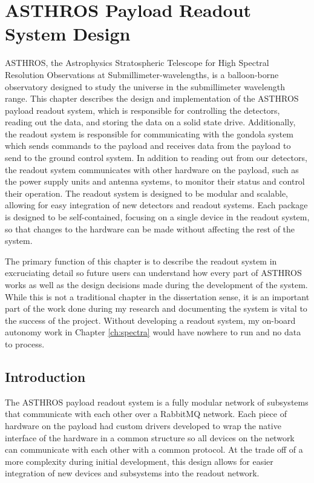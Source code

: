 \chapter[ASTHROS Payload Readout System Design]{ASTHROS Payload Readout System Design}
\label{ch:readout}
ASTHROS, the Astrophysics Stratospheric Telescope for High Spectral Resolution Observations at Submillimeter-wavelengths, is a balloon-borne observatory designed to study the universe in the submillimeter wavelength range.
This chapter describes the design and implementation of the ASTHROS payload readout system, which is responsible for controlling the detectors, reading out the data, and storing the data on a solid state drive.
Additionally, the readout system is responsible for communicating with the gondola system which sends commands to the payload and receives data from the payload to send to the ground control system.
In addition to reading out from our detectors, the readout system communicates with other hardware on the payload, such as the power supply units and antenna systems, to monitor their status and control their operation.
The readout system is designed to be modular and scalable, allowing for easy integration of new detectors and readout systems.
Each package is designed to be self-contained, focusing on a single device in the readout system, so that changes to the hardware can be made without affecting the rest of the system.

The primary function of this chapter is to describe the readout system in excruciating detail so future users can understand how every part of ASTHROS works as well as the design decisions made during the development of the system.
While this is not a traditional chapter in the dissertation sense, it is an important part of the work done during my research and documenting the system is vital to the success of the project.
Without developing a readout system, my on-board autonomy work in Chapter \ref{ch:spectra} would have nowhere to run and no data to process.

\section{Introduction}
The ASTHROS payload readout system is a fully modular network of subsystems that communicate with each other over a RabbitMQ network.
Each piece of hardware on the payload had custom drivers developed to wrap the native interface of the hardware in a common structure so all devices on the network can communicate with each other with a common protocol.
At the trade off of a more complexity during initial development, this design allows for easier integration of new devices and subsystems into the readout network.

